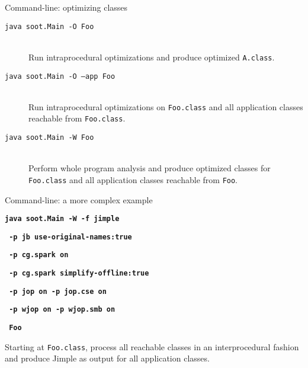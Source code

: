 \begin{slide}{Command-line: optimizing classes}
\begin{description}
\item[\texttt{java soot.Main -O Foo}] \hspace{1in} \\
Run intraprocedural optimizations and produce optimized {\tt A.class}.
\item[\texttt{java soot.Main -O --app Foo}] \hspace{1in} \\
Run intraprocedural optimizations on \texttt{Foo.class} and all
application classes reachable from {\tt Foo.class}. 
\item[\texttt{java soot.Main -W Foo}] \hspace{1in} \\
Perform whole program analysis and produce optimized classes for \texttt{Foo.class} and all application classes reachable from {\tt Foo}.
\end{description}
\end{slide}

\begin{slide}{Command-line: a more complex example}

\begin{small}
\textbf{\red\texttt{java soot.Main -W -f jimple}}

\textbf{\texttt{     -p jb use-original-names:true }}

\textbf{\texttt{     -p cg.spark on }}

\textbf{\texttt{     -p cg.spark simplify-offline:true}}

\textbf{\texttt{     -p jop on -p jop.cse on   }}

\textbf{\texttt{     -p wjop on  -p wjop.smb on }}

\textbf{\red\texttt{     Foo }}
\end{small}

\vspace{.2in}

Starting at \texttt{Foo.class}, process all reachable classes in an
interprocedural fashion and produce Jimple as output for all application
classes.   
\end{slide}


